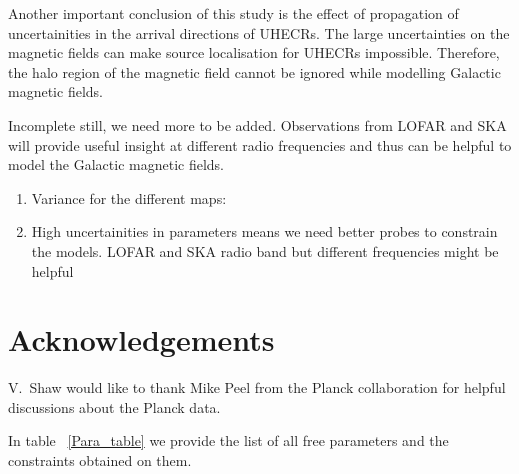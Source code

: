 \documentclass[usenatbib]{mnras}
\newcommand{\Vasu}[1]{{\color{purple}#1}}
\begin{document}
Another important conclusion of this study is the effect of propagation of uncertainities in the arrival directions of UHECRs. The large uncertainties on the magnetic fields can make source localisation for UHECRs impossible.
Therefore, the halo region of the magnetic field cannot be ignored while modelling Galactic magnetic fields. 

\Vasu{Incomplete still, we need more to be added.}
Observations from LOFAR and SKA will provide useful insight at different radio frequencies and thus can be helpful to model the Galactic magnetic fields.

\begin{enumerate}

 
    \item Variance for the different maps:
    
    \item High uncertainities in parameters means we need better probes to constrain the models. LOFAR and SKA radio band but different frequencies might be helpful
   
\end{enumerate}



\section*{Acknowledgements}
V.~Shaw would like to thank Mike Peel from the Planck collaboration for helpful discussions about the Planck data.




\appendix


In table ~\ref{Para_table} we provide the list of all free parameters and the constraints obtained on them.
\end{document}
